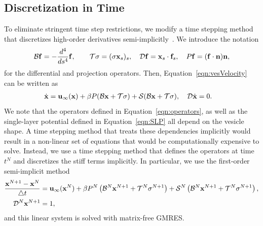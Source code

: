 \documentclass[prb,preprint,showpacs,preprintnumbers,amsmath,amssymb,longbibliography]{revtex4-1}
\begin{document}
\subsection{Discretization in Time}
To eliminate stringent time step restrictions, we modify a time stepping
method that discretizes high-order derivatives
semi-implicitly~\cite{vee-gue-zor-bir2009, qua-bir2014}. We introduce
the notation
\begin{align}
  \mathcal{B}\mathbf{f} = -\frac{d^4}{ds^4} \mathbf{f},  \qquad
  \mathcal{T}\sigma = (\sigma \mathbf{x}_s)_s, \quad
  \mathcal{D}\mathbf{f} = \mathbf{x}_s \cdot \mathbf{f}_s, \quad
  P\mathbf{f} = (\mathbf{f} \cdot \mathbf{n}) \mathbf{n},
  \label{eqn:operators}
\end{align}
for the differential and projection operators. Then,
Equation~\eqref{eqn:vesVelocity} can be written as
\begin{align}
  \dot{\mathbf{x}} &= \mathbf{u}_\infty(\mathbf{x}) + \beta P(\mathcal{B}\mathbf{x} + \mathcal{T}\sigma)
  + \mathcal{S} (\mathcal{B}\mathbf{x} + \mathcal{T}\sigma), \quad \mathcal{D} \dot{\mathbf{x}} = 0.
\end{align}
We note that the operators defined in Equation~\eqref{eqn:operators}, as
well as the single-layer potential defined in Equation~\eqref{eqn:SLP}
all depend on the vesicle shape. A time stepping method that treats
these dependencies implicitly would result in a non-linear set of
equations that would be computationally expensive to solve. Instead, we
use a time stepping method that defines the operators at time $t^N$ and
discretizes the stiff terms implicitly. In particular, we use the
first-order semi-implicit method
\begin{alignat}{3}  
  \frac{\mathbf{x}^{N+1} - \mathbf{x}^N}{\triangle t} &= \mathbf{u}_\infty(\mathbf{x}^N) 
  + \beta P^N\left(\mathcal{B}^N\mathbf{x}^{N+1} + \mathcal{T}^N\sigma^{N+1}\right) 
  + \mathcal{S}^N\left(\mathcal{B}^N\mathbf{x}^{N+1} + \mathcal{T}^N\sigma^{N+1}\right),  \\
  \mathcal{D}^N\mathbf{x}^{N+1} &= 1,
\end{alignat}
and this linear system is solved with matrix-free GMRES.
\end{document}

